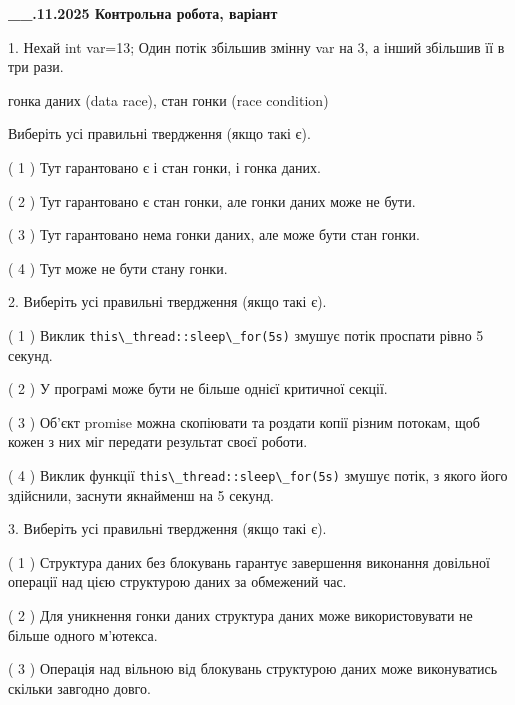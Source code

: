 \documentclass[12pt, ukrainian]{article}
\def\code#1{\Verb!#1!}
\begin{document}
\newpage
\begin {large}

\textbf{\_\_.11.2025 Контрольна робота, варіант  }\par


{
1. Нехай int var=13; Один потік збільшив змінну var на 3, а інший збільшив її в три рази.

гонка даних (data race), стан гонки (race condition)

Виберіть усі правильні твердження (якщо такі є).\par
\vspace{2mm}
( 1 ) Тут гарантовано є і стан гонки, і гонка даних.%

( 2 ) Тут гарантовано є стан гонки, але гонки даних може не бути.%

( 3 ) Тут гарантовано нема гонки даних, але може бути стан гонки.%

( 4 ) Тут може не бути стану гонки.%


2. Виберіть усі правильні твердження (якщо такі є).\par
\vspace{2mm}

( 1 ) Виклик \code{this\_thread::sleep\_for(5s)} змушує потік проспати рівно 5 секунд.%

( 2 ) У програмі може бути не більше однієї критичної секції.%

( 3 ) Об’єкт promise можна скопіювати та роздати копії різним потокам, щоб кожен з них міг передати результат своєї роботи.%

( 4 ) Виклик функції \code{this\_thread::sleep\_for(5s)} змушує потік, з якого його здійснили, заснути якнайменш на 5 секунд.%


3. Виберіть усі правильні твердження (якщо такі є).\par
\vspace{2mm}

( 1 ) Структура даних без блокувань гарантує завершення виконання довільної операції над цією структурою даних за обмежений час.%

( 2 ) Для уникнення гонки даних структура даних може використовувати не більше одного м’ютекса.%

( 3 ) Операція над вільною від блокувань структурою даних може виконуватись скільки завгодно довго.%

}
\end{large}
\end{document}
